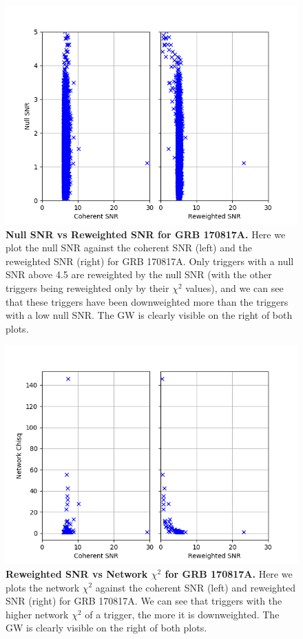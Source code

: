 \documentclass[11pt]{cuthesis}
\begin{document}
\begin{figure} %
\begin{center}
\includegraphics[width=0.8\linewidth]{network_snrs_vs_null_170817.png}
\end{center}
\caption{\textbf{Null SNR vs Reweighted SNR for GRB 170817A.} Here we plot the null SNR against the coherent SNR (left) and the reweighted SNR (right) for GRB 170817A. Only triggers with a null SNR above 4.5 are reweighted by the null SNR (with the other triggers being reweighted only by their $\chi^2$ values), and we can see that these triggers have been downweighted more than the triggers with a low null SNR. The GW is clearly visible on the right of both plots.} 
\label{fig:null vs snrs 170817}
\end{figure}


\begin{figure} %
\begin{center}
\includegraphics[width=0.8\linewidth]{network_snrs_vs_chisqN_170817.png}
\end{center}
\caption{\textbf{Reweighted SNR vs Network $\chi^2$ for GRB 170817A.} Here we plots the network $\chi^2$ against the coherent SNR (left) and reweighted SNR (right) for GRB 170817A. We can see that triggers with the higher network $\chi^2$ of a trigger, the more it is downweighted. The GW is clearly visible on the right of both plots. } 
\label{fig:snrs vs chisq 170817}
\end{figure}
\end{document}
